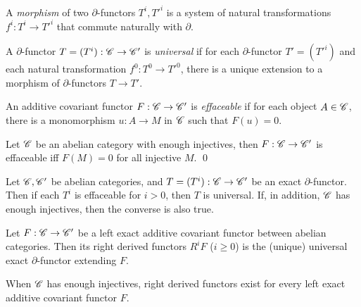 \documentclass[11pt]{amsart}
\begin{document}
\begin{defn}
    A \emph{morphism} of two $\partial$-functors $T^i, T'^i$ is a system of natural transformations $f^i: T^i\to T'^i$ that commute naturally with $\partial$.
\end{defn}

\begin{defn}[universal]
    A $\partial$-functor $T = (T^i): \mathscr{C} \to \mathscr{C}'$ is \emph{universal} if for each $\partial$-functor $T' = (T'^i)$ and each natural transformation $f^0: T^0\to T'^0$, there is a unique extension to a morphism of $\partial$-functors $T\to T'$.
\end{defn}

\begin{defn}[effaceable]
    An additive covariant functor $F: \mathscr{C}\to \mathscr{C}'$ is \emph{effaceable} if for each object $A\in \mathscr{C}$, there is a monomorphism $u:A\to M$ in $\mathscr{C}$ such that $F(u) = 0$.
\end{defn}

\begin{prop}
    Let $\mathscr{C}$ be an abelian category with enough injectives, then $F:\mathscr{C} \to \mathscr{C}'$ is effaceable iff $F(M) = 0$ for all injective $M$. \qed
\end{prop}


\begin{thm}
    Let $\mathscr{C}, \mathscr{C}'$ be abelian categories, and $T = (T^i): \mathscr{C}\to \mathscr{C}'$ be an exact $\partial$-functor. Then if each $T^i$ is effaceable for $i>0$, then $T$ is universal. If, in addition, $\mathscr{C}$ has enough injectives, then the converse is also true.
\end{thm}

\begin{defn}
    Let $F:\mathscr{C}\to \mathscr{C}'$ be a left exact additive covariant functor between abelian categories. Then its right derived functors $R^iF$ ($i\ge 0$) is the (unique) universal exact $\partial$-functor extending $F$.
\end{defn}

\begin{thm}
    When $\mathscr{C}$ has enough injectives, right derived functors exist for every left exact additive covariant functor $F$.
\end{thm}
\end{document}
